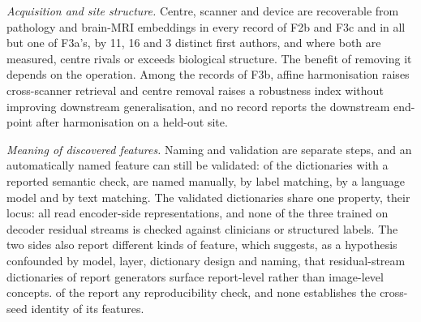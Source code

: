 \emph{Acquisition and site structure.} Centre, scanner and device are recoverable from pathology and
brain-MRI embeddings in every record of F2b and F3c and in all but one of F3a's, by 11, 16 and 3
distinct first authors, and where both are measured, centre rivals or exceeds biological structure. The
benefit of removing it depends on the operation. Among the records of F3b, affine harmonisation raises
cross-scanner retrieval and centre removal raises a robustness index without improving downstream
generalisation, and no record reports the downstream end-point after harmonisation on a held-out site.

\emph{Meaning of discovered features.} Naming and validation are separate steps, and an automatically
named feature can still be validated: of the \Nsaeval{} dictionaries with a reported semantic check,
\Nsaemanual{} are named manually, \Nsaelabmatch{} by label matching, \Nsaellm{} by a language model and
\Nsaetext{} by text matching. The validated dictionaries share one property, their locus: all read
encoder-side representations, and none of the three trained on decoder residual streams is checked
against clinicians or structured labels. The two sides also report different kinds of feature, which
suggests, as a hypothesis confounded by model, layer, dictionary design and naming, that
residual-stream dictionaries of report generators surface report-level rather than image-level
concepts. \Nsaestab{} of the \Nsae{} report any reproducibility check, and none establishes the
cross-seed identity of its features.

